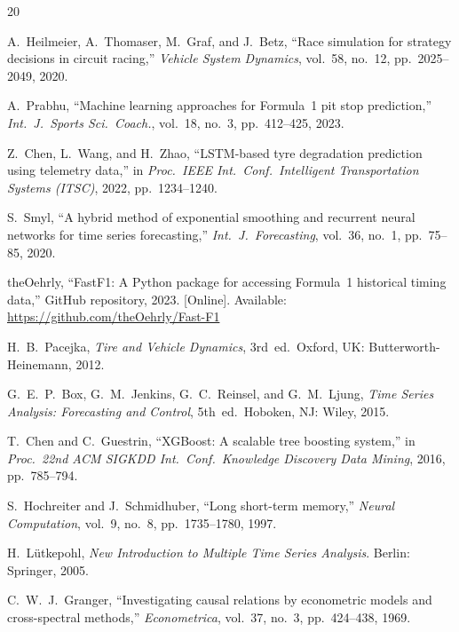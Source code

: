 \documentclass[journal,twoside]{IEEEtran}
\begin{document}
\begin{thebibliography}{20}

A.~Heilmeier, A.~Thomaser, M.~Graf, and J.~Betz,
``Race simulation for strategy decisions in circuit racing,''
\emph{Vehicle System Dynamics}, vol.~58, no.~12, pp.~2025--2049,
2020.

A.~Prabhu,
``Machine learning approaches for Formula~1 pit stop prediction,''
\emph{Int.\ J.\ Sports Sci.\ Coach.}, vol.~18, no.~3, pp.~412--425,
2023.

Z.~Chen, L.~Wang, and H.~Zhao,
``LSTM-based tyre degradation prediction using telemetry data,''
in \emph{Proc.\ IEEE Int.\ Conf.\ Intelligent Transportation Systems
(ITSC)}, 2022, pp.~1234--1240.

S.~Smyl,
``A hybrid method of exponential smoothing and recurrent neural
networks for time series forecasting,''
\emph{Int.\ J.\ Forecasting}, vol.~36, no.~1, pp.~75--85, 2020.

theOehrly,
``FastF1: A Python package for accessing Formula~1 historical timing
data,'' GitHub repository, 2023.
[Online]. Available: \url{https://github.com/theOehrly/Fast-F1}

H.~B.~Pacejka,
\emph{Tire and Vehicle Dynamics}, 3rd~ed.\
Oxford, UK: Butterworth-Heinemann, 2012.

G.~E.~P.~Box, G.~M.~Jenkins, G.~C.~Reinsel, and G.~M.~Ljung,
\emph{Time Series Analysis: Forecasting and Control}, 5th~ed.\
Hoboken, NJ: Wiley, 2015.

T.~Chen and C.~Guestrin,
``XGBoost: A scalable tree boosting system,''
in \emph{Proc.\ 22nd ACM SIGKDD Int.\ Conf.\ Knowledge Discovery
Data Mining}, 2016, pp.~785--794.

S.~Hochreiter and J.~Schmidhuber,
``Long short-term memory,''
\emph{Neural Computation}, vol.~9, no.~8, pp.~1735--1780, 1997.

\bibitem{lutkepohl2005new}
H.~L{\"u}tkepohl,
\emph{New Introduction to Multiple Time Series Analysis}.
Berlin: Springer, 2005.

C.~W.~J.~Granger,
``Investigating causal relations by econometric models and
cross-spectral methods,''
\emph{Econometrica}, vol.~37, no.~3, pp.~424--438, 1969.


\end{thebibliography}
\end{document}
